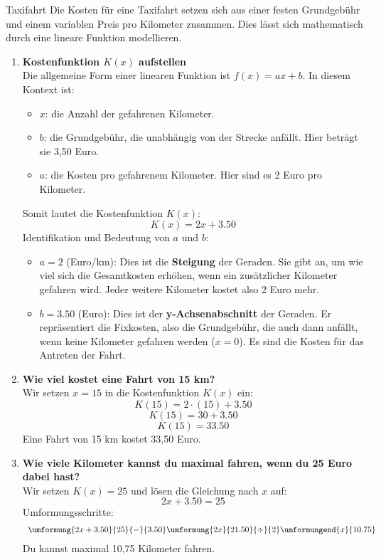 \begin{loesungsumgebung}{Taxifahrt}
Die Kosten für eine Taxifahrt setzen sich aus einer festen Grundgebühr und einem variablen Preis pro Kilometer zusammen. Dies lässt sich mathematisch durch eine lineare Funktion modellieren.

\begin{enumerate}
    \item \textbf{Kostenfunktion $K(x)$ aufstellen} \\
    Die allgemeine Form einer linearen Funktion ist $f(x) = ax + b$. In diesem Kontext ist:
    \begin{itemize}
        \item $x$: die Anzahl der gefahrenen Kilometer.
        \item $b$: die Grundgebühr, die unabhängig von der Strecke anfällt. Hier beträgt sie 3,50 Euro.
        \item $a$: die Kosten pro gefahrenem Kilometer. Hier sind es 2 Euro pro Kilometer.
    \end{itemize}
    Somit lautet die Kostenfunktion $K(x)$:
    $$ K(x) = 2x + 3.50 $$
    Identifikation und Bedeutung von $a$ und $b$:
    \begin{itemize}
        \item $a = 2$ (Euro/km): Dies ist die \textbf{Steigung} der Geraden. Sie gibt an, um wie viel sich die Gesamtkosten erhöhen, wenn ein zusätzlicher Kilometer gefahren wird. Jeder weitere Kilometer kostet also 2 Euro mehr.
        \item $b = 3.50$ (Euro): Dies ist der \textbf{y-Achsenabschnitt} der Geraden. Er repräsentiert die Fixkosten, also die Grundgebühr, die auch dann anfällt, wenn keine Kilometer gefahren werden ($x=0$). Es sind die Kosten für das Antreten der Fahrt.
    \end{itemize}

    \item \textbf{Wie viel kostet eine Fahrt von 15 km?} \\
    Wir setzen $x=15$ in die Kostenfunktion $K(x)$ ein:
    $$ K(15) = 2 \cdot (15) + 3.50 $$
    $$ K(15) = 30 + 3.50 $$
    $$ K(15) = 33.50 $$
    Eine Fahrt von 15 km kostet 33,50 Euro.

    \item \textbf{Wie viele Kilometer kannst du maximal fahren, wenn du 25 Euro dabei hast?} \\
    Wir setzen $K(x) = 25$ und lösen die Gleichung nach $x$ auf:
    $$ 2x + 3.50 = 25 $$
    Umformungsschritte:
    $$
    \begin{array}{r c l c l}
    \umformung{2x + 3.50}{25}{-}{3.50}
    \umformung{2x}{21.50}{\div}{2}
    \umformungend{x}{10.75}
    \end{array}
    $$
    Du kannst maximal 10,75 Kilometer fahren.


\end{enumerate}
\end{loesungsumgebung}
